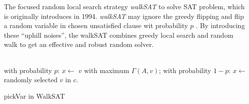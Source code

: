 \documentclass[12pt,a4paper,twoside]{scrartcl}
\numberwithin{equation}{section}
\begin{document}
The focused random local search strategy \emph{walkSAT} to solve SAT problem, which is originally introduces in 1994\cite{hoos2002adaptive}.  \emph{walkSAT} may ignore the greedy flipping and flip a random variable in chosen unsatisfied clause wit probability $p$ . By introducing these ``uphill noises'', the walkSAT combines greedy local search and random walk to get an effective and robust random solver. \\
\\
\begin{algorithm}[H]
  with probability $p$: $x \leftarrow$   $v$ with maximum $\Gamma(A,v)$; \;
  with probability $1-p$:  $x \leftarrow$  randomly selected $v$ in $c$. 
 \caption{pickVar in WalkSAT}
\end{algorithm}  
\end{document}
